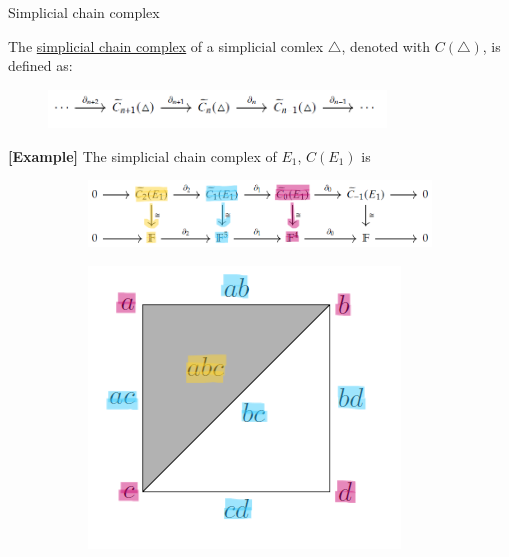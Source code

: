 \documentclass[xcolor={dvipsnames,svgnames}]{beamer}
\begin{document}
\begin{frame}{Simplicial chain complex}
\begin{defn}
The \underline{simplicial chain complex} of a simplicial comlex $\triangle$, denoted with $C(\triangle)$, is defined as:
\begin{figure}[H]
        \centering \includegraphics[width=0.8\textwidth]{figures/chain.png}
    \end{figure}
\end{defn}
\textbf{[Example]} The simplicial chain complex of $E_1$, $C(E_1)$ is 
\begin{figure}[H]
\centering
\begin{subfigure}[b]{0.7\textwidth}
 \includegraphics[width=\textwidth]{figures/chain_E1_colored.png}
\end{subfigure}
\hfill
\begin{subfigure}[b]{0.25\textwidth}
 \includegraphics[width=\textwidth]{figures/E1_colored.png}
\end{subfigure}
\end{figure}
\end{frame}
\end{document}
